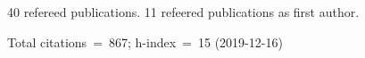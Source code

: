 40 refereed publications. 11 refeered publications as first author.

Total citations~=~867; h-index~=~15 (2019-12-16)